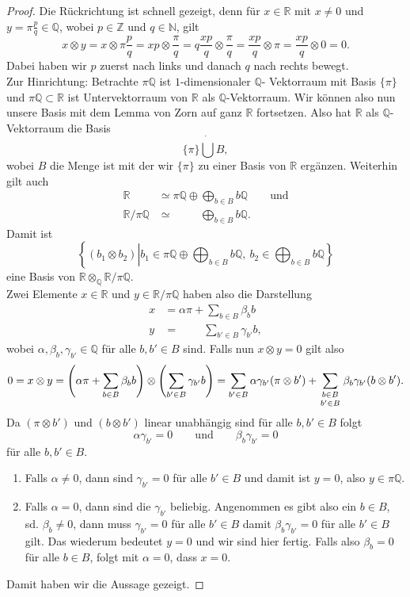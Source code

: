 \documentclass[11pt,titlepage]{article}
\newcommand{\setN}{\mathbb{N}}
\newcommand{\setZ}{\mathbb{Z}}
\newcommand{\setQ}{\mathbb{Q}}
\newcommand{\setR}{\mathbb{R}}
\theoremstyle{definition}
\theoremstyle{remark}
\begin{document}
	\begin{proof}
		Die Rückrichtung ist schnell gezeigt, 
		denn für $x\in\setR$ mit $x\neq 0$ und $y=\pi\frac{p}{q}\in\setQ$, wobei $p\in\setZ$ und $q\in\setN$, gilt
		\[ x\otimes y =x\otimes\pi \frac{p}{q} =xp\otimes\frac{\pi}{q} =q\frac{xp}{q}
		\otimes\frac{\pi}{q} = \frac{xp}{q}\otimes\pi =\frac{xp}{q}\otimes 0=0.\]
		Dabei haben wir $p$ zuerst nach links und danach $q$ nach rechts bewegt. \\
		Zur Hinrichtung: Betrachte $\pi\setQ$ ist $1$-dimensionaler $\setQ$-
		Vektorraum mit Basis $\{\pi\}$ und $\pi\setQ\subset\setR$ ist 
		Untervektorraum von $\setR$ als $\setQ$-Vektorraum. Wir können also nun 
		unsere Basis mit dem Lemma von Zorn auf ganz $\setR$ fortsetzen. 
		Also hat $\setR$ als $\setQ$-Vektorraum die Basis
		\[\{\pi\}\dot\bigcup B,\]
		wobei $B$ die Menge ist mit der wir $\{\pi\}$ zu einer Basis von $\setR$ 
		ergänzen. Weiterhin gilt auch
		\begin{align*}
			\setR&\simeq\pi\setQ\oplus\bigoplus_{b\in B}b\setQ\qquad\text{und}\\
			\setR /\pi\setQ&\simeq\qquad\ \ \bigoplus_{b\in B}b\setQ.
		\end{align*}
		Damit ist
		\[\left\{(b_1\otimes b_2)\left\vert b_1\in\pi\setQ\oplus\bigoplus_{b\in B}b\setQ,\ b_2\in \bigoplus_{b\in B}b\setQ\right\}\right.\]
		eine Basis von $\setR\otimes_\setQ\setR/\pi\setQ$. \\
		Zwei Elemente $x\in\setR$ und $y\in\setR/\pi\setQ$ haben also die 
		Darstellung
		\begin{align*}
			x&=\alpha\pi+\sum_{b\in B}\beta_b b \\
			y&= \qquad\ \sum_{b'\in B}\gamma_{b'}b,
		\end{align*}
		wobei $\alpha,\beta_b,\gamma_{b'}\in\setQ$ für alle $b,b'\in B$ sind. 
		Falls nun $x\otimes y=0$ gilt also
		\[0=x\otimes y=\left(\alpha\pi+\sum_{b\in B}\beta_b b\right)\otimes
		\left(\sum_{b'\in B}\gamma_{b'}b\right)=\sum_{b'\in 
		B}\alpha\gamma_{b'}(\pi\otimes b')+\sum_{\genfrac{}{}{0pt}{1}{b\in B}
		{b'\in B}} \beta_b\gamma_{b'}(b\otimes b').\]
		Da $(\pi\otimes b')$ und $(b\otimes b')$ linear unabhängig sind für alle  
		$b,b'\in B$ folgt
		\[\alpha\gamma_{b'}=0\qquad\text{und}\qquad \beta_b\gamma_{b'}=0\]
		für alle $b,b'\in B$. 
		\begin{enumerate}
			\item Falls $\alpha\neq 0$, dann sind $\gamma_{b'}=0$ für alle 
			$b'\in B$ und damit ist $y=0$, also $y\in \pi\setQ$.
			\item Falls $\alpha=0$, dann sind die $\gamma_{b'}$ beliebig. 
			Angenommen es gibt also ein $b\in B$, sd. $\beta_b \neq 0$, dann 
			muss $\gamma_{b'}=0$ für alle $b'\in B$ damit $\beta_b\gamma_{b'}=0$ 
			für alle $b'\in B$ gilt. Das wiederum bedeutet $y=0$ und wir sind hier 
			fertig. Falls also $\beta_b=0$ für alle $b\in B$, folgt mit $\alpha=0$, 
			dass $x=0$.
		\end{enumerate}
		Damit haben wir die Aussage gezeigt.
	\end{proof}
\end{document}

